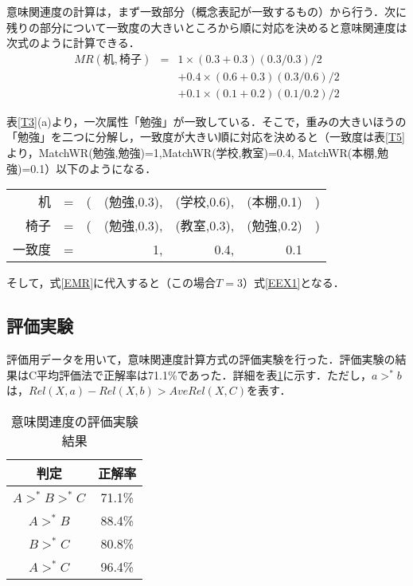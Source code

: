 意味関連度の計算は，まず一致部分（概念表記が一致するもの）から行う．次に残りの部分について一致度の大きいところから順に対応を決めると意味関連度は次式のように計算できる．
\begin{eqnarray}
MR(机,椅子) &=& 1\times(0.3+0.3)(0.3/0.3)/2       \nonumber \\
            & & + 0.4 \times (0.6+0.3)(0.3/0.6)/2 \nonumber \\
            & & + 0.1 \times (0.1+0.2)(0.1/0.2)/2 \label{EEX1}
\end{eqnarray}

表\ref{T3}(a)より，一次属性「勉強」が一致している．そこで，重みの大きいほうの「勉強」を二つに分解し，一致度が大きい順に対応を決めると（一致度は表\ref{T5}より，MatchWR(勉強,勉強)=1,MatchWR(学校,教室)=0.4, MatchWR(本棚,勉強)=0.1）以下のようになる．

\begin{tabular}{rrrrrrr} 
机     &=& (&(勉強,0.3),&(学校,0.6),&(本棚,0.1)& )         \\
椅子   &=& (&(勉強,0.3),&(教室,0.3),&(勉強,0.2)& )         \\
一致度 &=&  &1,         & 0.4,      &0.1       &           \\
\end{tabular}

そして，式\ref{EMR}に代入すると（この場合$T=3$）式\ref{EEX1}となる．

\subsection{評価実験}

評価用データを用いて，意味関連度計算方式の評価実験を行った．評価実験の結果はC平均評価法で正解率は71.1\%であった．詳細を表\ref{T6}に示す．ただし，$a >^* b$は，$Rel(X,a) - Rel(X,b) > AveRel(X,C)$を表す．

\begin{table}[tb]
\caption[]{意味関連度の評価実験結果}
\label{T6}
\begin{center}
\begin{tabular}{|c|c|} \hline
判定    & 正解率 \\ \hline
$A >^* B >^* C$ & 71.1\% \\ \hline
$A >^* B$       & 88.4\% \\ \hline
$B >^* C$       & 80.8\% \\ \hline
$A >^* C$       & 96.4\% \\ \hline
\end{tabular}
\end{center}
\end{table}

